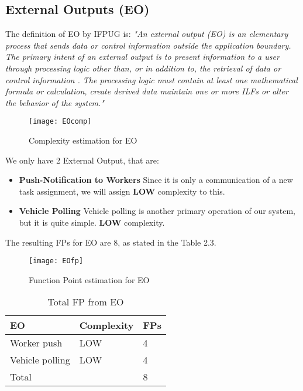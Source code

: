 \clearpage

\subsection{External Outputs (EO)}
The definition of EO by IFPUG is: \bigbreak
\textit{"An external output (EO) is an elementary process that sends data or control information outside the application boundary. The primary intent of an external output is to present information to a user through processing logic other than, or in addition to, the retrieval of data or control information . The processing logic must contain at least one mathematical formula or calculation, create derived data maintain one or more ILFs or alter the behavior of the system."}
\bigbreak
\begin{figure}
  \centering
  \texttt{[image: EOcomp]}
  \caption{Complexity estimation for EO}
\end{figure}
We only have 2 External Output, that are:
\begin{itemize}
\item \textbf{Push-Notification to Workers} Since it is only a communication of a new task assignment, we will assign \textbf{LOW} complexity to this.
\item \textbf{Vehicle Polling} Vehicle polling is another primary operation of our system, but it is quite simple. \textbf{LOW} complexity.
\end{itemize}

The resulting FPs for EO are 8, as stated in the Table 2.3.

\begin{figure}
  \centering
  \texttt{[image: EOfp]}
  \caption{Function Point estimation for EO}
\end{figure}

\clearpage

\begin{table}
  \centering
    \begin{tabular}{| l | l | l |}
    \hline
    \textbf{EO} & \textbf{Complexity} & \textbf{FPs} \\ \hline
    Worker push & LOW & 4 \\ \hline
    Vehicle polling & LOW & 4\\ \hline
    \hline
    \multicolumn{2}{|l|}{Total} & 8 \\ \hline
    \end{tabular}
  \caption{Total FP from EO}
\end{table}

